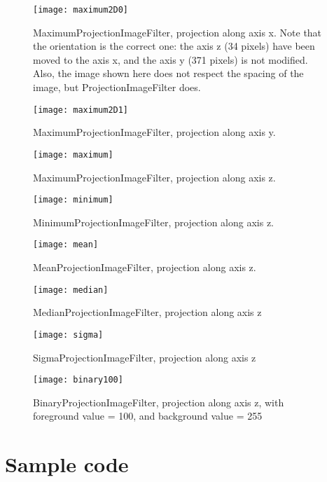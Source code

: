 \documentclass{InsightArticle}
\begin{document}
\begin{figure}[htbp]
\centering
\texttt{[image: maximum2D0]}
\caption{MaximumProjectionImageFilter, projection along axis x. Note that the orientation
is the correct one: the axis z (34 pixels) have been moved to the axis x, and the axis y
(371 pixels) is not modified. Also, the image shown here does not respect the spacing
of the image, but ProjectionImageFilter does.\label{maximum0}}
\end{figure}

\begin{figure}[htbp]
\centering
\texttt{[image: maximum2D1]}
\caption{MaximumProjectionImageFilter, projection along axis y.\label{maximum1}}
\end{figure}

\begin{figure}[htbp]
\centering
\texttt{[image: maximum]}
\caption{MaximumProjectionImageFilter, projection along axis z.\label{maximum}}
\end{figure}

\begin{figure}[htbp]
\centering
\texttt{[image: minimum]}
\caption{MinimumProjectionImageFilter, projection along axis z.\label{minimum}}
\end{figure}

\begin{figure}[htbp]
\centering
\texttt{[image: mean]}
\caption{MeanProjectionImageFilter, projection along axis z.\label{mean}}
\end{figure}

\begin{figure}[htbp]
\centering
\texttt{[image: median]}
\caption{MedianProjectionImageFilter, projection along axis z\label{median}}
\end{figure}

\begin{figure}[htbp]
\centering
\texttt{[image: sigma]}
\caption{SigmaProjectionImageFilter, projection along axis z\label{sigma}}
\end{figure}

\begin{figure}[htbp]
\centering
\texttt{[image: binary100]}
\caption{BinaryProjectionImageFilter, projection along axis z, with foreground value = 100, and background value = 255\label{binary100}}
\end{figure}

\section{Sample code}
\end{document}
